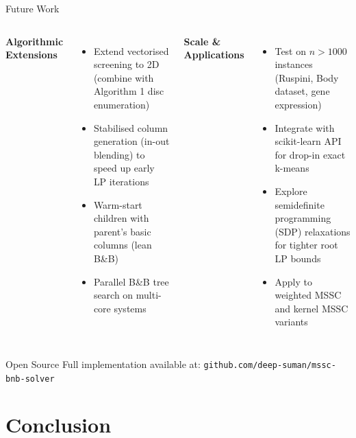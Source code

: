 \documentclass[aspectratio=169,12pt]{beamer}
\begin{document}
\begin{frame}{Future Work}
  \begin{columns}[T]
      \textbf{Algorithmic Extensions}
      \begin{itemize}
        \item Extend vectorised screening to 2D (combine with Algorithm 1 disc enumeration)
        \item Stabilised column generation (in-out blending) to speed up early LP iterations
        \item Warm-start children with parent's basic columns (lean B\&B)
        \item Parallel B\&B tree search on multi-core systems
      \end{itemize}

      \textbf{Scale \& Applications}
      \begin{itemize}
        \item Test on $n > 1000$ instances (Ruspini, Body dataset, gene expression)
        \item Integrate with scikit-learn API for drop-in exact k-means
        \item Explore semidefinite programming (SDP) relaxations for tighter root LP bounds
        \item Apply to weighted MSSC and kernel MSSC variants
      \end{itemize}
  \end{columns}

  \vspace{0.5em}
  \begin{block}{Open Source}
    Full implementation available at: \texttt{github.com/deep-suman/mssc-bnb-solver}
  \end{block}
\end{frame}

\section{Conclusion}
\end{document}
